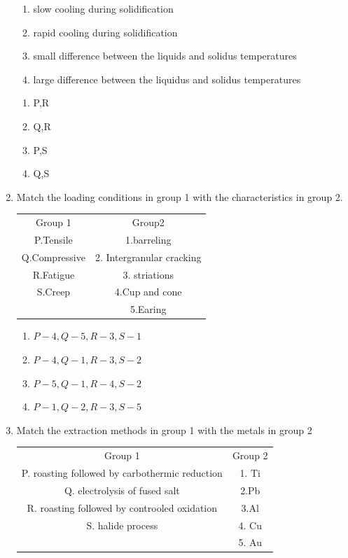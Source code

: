 \documentclass[journal]{IEEEtran}
\theoremstyle{remark}
\begin{document}
\begin{enumerate}
\begin{enumerate}[label=\Alph*),start=16]
    \item slow cooling during solidification  
    \item rapid cooling during solidification
    \item small difference between the liquids and solidus temperatures
    \item large difference between the liquidus and solidus temperatures
\end{enumerate}
\begin{multicols}{4}
\begin{enumerate}
    \item P,R
    \item Q,R
    \item P,S
    \item Q,S
\end{enumerate}
\end{multicols}
\item Match the loading conditions in group 1 with the characteristics in group 2.\hfill{}
\begin{center}
\begin{tabular}{c c}
Group 1     &Group2  \\
P.Tensile     &1.barreling\\
Q.Compressive &2. Intergranular cracking\\
R.Fatigue &3. striations\\
S.Creep &4.Cup and cone\\
       &5.Earing
\end{tabular}
\end{center}
\begin{multicols}{2}
\begin{enumerate}
    \item $P-4,Q-5,R-3,S-1$
    \item $P-4,Q-1,R-3,S-2$
    \item $P-5,Q-1,R-4,S-2$
    \item $P-1,Q-2,R-3,S-5$
\end{enumerate}
\end{multicols}
\item  Match the extraction methods in group 1 with the metals in group 2 \hfill{}
\begin{center}
\begin{tabular}{c c}
Group 1     &Group 2  \\
P. roasting followed by carbothermic reduction     & 1. Ti\\
Q. electrolysis of fused salt & 2.Pb\\
R. roasting followed by controoled oxidation & 3.Al\\
S. halide process & 4. Cu\\
      &5. Au
\end{tabular}
\end{center}


\end{enumerate}
\end{document}
